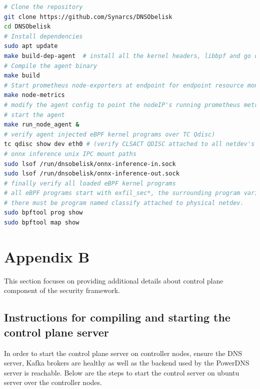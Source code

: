 \documentclass [11pt, proquest] {uwthesis}[2020/02/24]
\begin{document}
{\footnotesize
\begin{lstlisting}[language=bash, 
    caption={Installation steps for eBPF Node agent at endpoint in data plane}, 
    label={lst:install-steps},
    aboveskip=0.5em, 
    belowskip=0.5em
]
# Clone the repository
git clone https://github.com/Synarcs/DNSObelisk
cd DNSObelisk
# Install dependencies
sudo apt update 
make build-dep-agent  # install all the kernel headers, libbpf and go compiler and packages
# Compile the agent binary 
make build 
# Start prometheus node-exporters at endpoint for endpoint resource monitoring 
make node-metrics
# modify the agent config to point the nodeIP's running prometheus metric server, kafka brokers, grafana visualization server (node_agent/config.yaml).
# start the agent
make run_node_agent &
# verify agent injected eBPF kernel programs over TC Qdisc)
tc qdisc show dev eth0 # (verify CLSACT QDISC attached to all netdev's and bridge interfaces).
# onnx inference unix IPC mount paths 
sudo lsof /run/dnsobelisk/onnx-inference-in.sock  
sudo lsof /run/dnsobelisk/onnx-inference-out.sock
# finally verify all loaded eBPF kernel programs 
# all eBPF programs start with exfil_sec*, the surrounding program varies based on number of netdev's
# there must be program named classify attached to physical netdev.
sudo bpftool prog show  
sudo bpftool map show
\end{lstlisting}
}



\section{Appendix B}
This section focuses on providing additional details about control plane component of the security framework. 

\subsection{Instructions for compiling and starting the control plane server}
In order to start the control plane server on controller nodes, ensure the DNS server, Kafka brokers are healthy as well as the backend used by the PowerDNS server is reachable. Below are the steps to start the control server on ubuntu server over the controller nodes.
\end{document}
